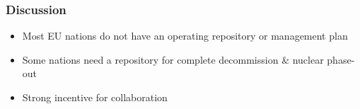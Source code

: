 \begin{frame}
	\frametitle{Discussion}
	\begin{itemize}
		\item Most EU nations do not have an operating repository or management plan
		\item Some nations need a repository for complete decommission \& nuclear phase-out	
		\item Strong incentive for collaboration
	\end{itemize}
\end{frame}